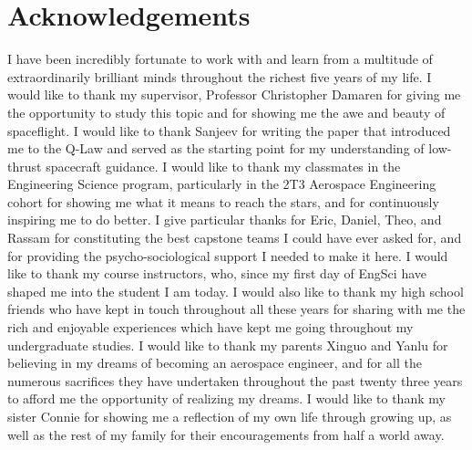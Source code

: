 \newpage
\vspace*{\fill}
\section*{Acknowledgements}
I have been incredibly fortunate to work with and learn from a multitude of extraordinarily brilliant minds throughout the richest five years of my life. I would like to thank my supervisor, Professor Christopher Damaren for giving me the opportunity to study this topic and for showing me the awe and beauty of spaceflight. I would like to thank Sanjeev for writing the paper that introduced me to the Q-Law and served as the starting point for my understanding of low-thrust spacecraft guidance. I would like to thank my classmates in the Engineering Science program, particularly in the 2T3 Aerospace Engineering cohort for showing me what it means to reach the stars, and for continuously inspiring me to do better. I give particular thanks for Eric, Daniel, Theo, and Rassam for constituting the best capstone teams I could have ever asked for, and for providing the psycho-sociological support I needed to make it here. I would like to thank my course instructors, who, since my first day of EngSci have shaped me into the student I am today. I would also like to thank my high school friends who have kept in touch throughout all these years for sharing with me the rich and enjoyable experiences which have kept me going throughout my undergraduate studies. I would like to thank my parents Xinguo and Yanlu for believing in my dreams of becoming an aerospace engineer, and for all the numerous sacrifices they have undertaken throughout the past twenty three years to afford me the opportunity of realizing my dreams. I would like to thank my sister Connie for showing me a reflection of my own life through growing up, as well as the rest of my family for their encouragements from half a world away.
\vspace*{\fill}


\tableofcontents
\listoffigures
\listoftables
